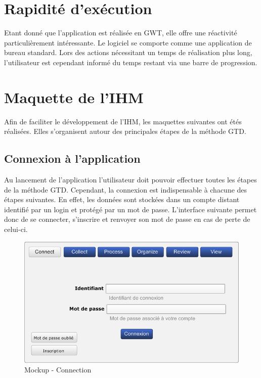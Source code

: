 \section{Rapidité d'exécution}
Etant donné que l'application est réalisée en GWT, elle offre une réactivité particulièrement intéressante. Le logiciel se comporte comme une application de bureau standard. Lors des actions nécessitant un temps de réalisation plus long, l'utilisateur est cependant informé du temps restant via une barre de progression.


\section{Maquette de l'IHM}

Afin de faciliter le développement de l'IHM, les maquettes suivantes ont étés réalisées. Elles s'organisent autour des principales étapes de la méthode GTD.

\subsection{Connexion à l'application}
Au lancement de l'application l'utilisateur doit pouvoir effectuer toutes les
étapes de la méthode GTD. Cependant, la connexion est indispensable à chacune
des étapes suivantes. En effet, les données sont stockées dans un compte
distant identifié par un login et protégé par un mot de passe. L'interface
suivante permet donc de se connecter, s'inscrire et renvoyer son mot de passe
en cas de perte de celui-ci.

\begin{figure}[H]
  \begin{center}
  \includegraphics[scale=0.5]{diagrams/connect.png}
  \caption{Mockup - Connection}
  \end{center}
\end{figure}

